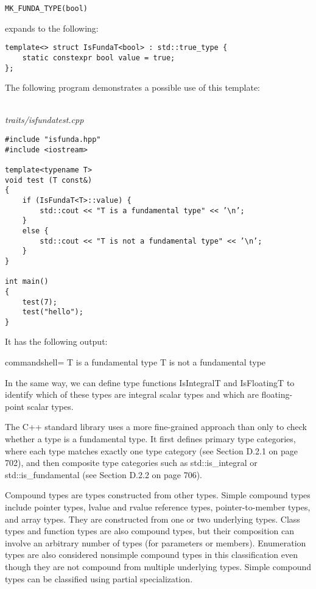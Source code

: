 \begin{lstlisting}[style=styleCXX]
MK_FUNDA_TYPE(bool)
\end{lstlisting}

expands to the following:

\begin{lstlisting}[style=styleCXX]
template<> struct IsFundaT<bool> : std::true_type {
	static constexpr bool value = true;
};
\end{lstlisting}

The following program demonstrates a possible use of this template:

\hspace*{\fill} \\ %
\noindent
\textit{traits/isfundatest.cpp}
\begin{lstlisting}[style=styleCXX]
#include "isfunda.hpp"
#include <iostream>

template<typename T>
void test (T const&)
{
	if (IsFundaT<T>::value) {
		std::cout << "T is a fundamental type" << ’\n’;
	}
	else {
		std::cout << "T is not a fundamental type" << ’\n’;
	}
}

int main()
{
	test(7);
	test("hello");
}
\end{lstlisting}

It has the following output:

\begin{tcblisting}{commandshell={}}
T is a fundamental type
T is not a fundamental type
\end{tcblisting}

In the same way, we can define type functions IsIntegralT and IsFloatingT to identify which of these types are integral scalar types and which are floating-point scalar types.

The C++ standard library uses a more fine-grained approach than only to check whether a type is a fundamental type. It first defines primary type categories, where each type matches exactly one type category (see Section D.2.1 on page 702), and then composite type categories such as std::is\_integral or std::is\_fundamental (see Section D.2.2 on page 706).


Compound types are types constructed from other types. Simple compound types include pointer types, lvalue and rvalue reference types, pointer-to-member types, and array types. They are constructed from one or two underlying types. Class types and function types are also compound types, but their composition can involve an arbitrary number of types (for parameters or members). Enumeration types are also considered nonsimple compound types in this classification even though they are not compound from multiple underlying types. Simple compound types can be classified using partial specialization.

